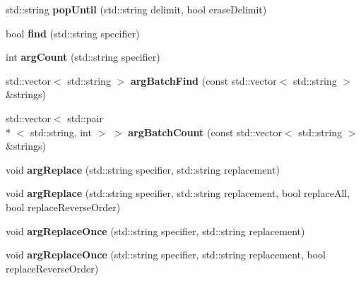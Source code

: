 \begin{DoxyCompactItemize}
\item 
\hypertarget{classStringstack_aaad2f5dc1df9ef88da1c2e2fc676f5dd}{std\-::string {\bfseries pop\-Until} (std\-::string delimit, bool erase\-Delimit)}\label{classStringstack_aaad2f5dc1df9ef88da1c2e2fc676f5dd}

\item 
\hypertarget{classStringstack_ab657ed4278c068f32715c8b0b4d03312}{bool {\bfseries find} (std\-::string specifier)}\label{classStringstack_ab657ed4278c068f32715c8b0b4d03312}

\item 
\hypertarget{classStringstack_ab3b7b4445b0ea898feaea34657e00c92}{int {\bfseries arg\-Count} (std\-::string specifier)}\label{classStringstack_ab3b7b4445b0ea898feaea34657e00c92}

\item 
\hypertarget{classStringstack_a6e9d7a9a8909e5699f935575bf15fb5c}{std\-::vector$<$ std\-::string $>$ {\bfseries arg\-Batch\-Find} (const std\-::vector$<$ std\-::string $>$ \&strings)}\label{classStringstack_a6e9d7a9a8909e5699f935575bf15fb5c}

\item 
\hypertarget{classStringstack_a807cfc6a9e73c3614e1ccec547721092}{std\-::vector$<$ std\-::pair\\*
$<$ std\-::string, int $>$ $>$ {\bfseries arg\-Batch\-Count} (const std\-::vector$<$ std\-::string $>$ \&strings)}\label{classStringstack_a807cfc6a9e73c3614e1ccec547721092}

\item 
\hypertarget{classStringstack_a73332f209b954e23d6486a7439a1d74a}{void {\bfseries arg\-Replace} (std\-::string specifier, std\-::string replacement)}\label{classStringstack_a73332f209b954e23d6486a7439a1d74a}

\item 
\hypertarget{classStringstack_af30cd5b798f448c0d4f73b013ab62eb7}{void {\bfseries arg\-Replace} (std\-::string specifier, std\-::string replacement, bool replace\-All, bool replace\-Reverse\-Order)}\label{classStringstack_af30cd5b798f448c0d4f73b013ab62eb7}

\item 
\hypertarget{classStringstack_a405bd0c49154f672b01474697a2dac45}{void {\bfseries arg\-Replace\-Once} (std\-::string specifier, std\-::string replacement)}\label{classStringstack_a405bd0c49154f672b01474697a2dac45}

\item 
\hypertarget{classStringstack_aa1082f1a7d5d0669b2249dae76ac3a06}{void {\bfseries arg\-Replace\-Once} (std\-::string specifier, std\-::string replacement, bool replace\-Reverse\-Order)}\label{classStringstack_aa1082f1a7d5d0669b2249dae76ac3a06}


\end{DoxyCompactItemize}
